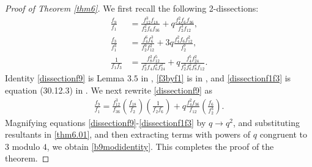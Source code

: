 \documentclass[reqno]{amsart}
\theoremstyle{definition}
\theoremstyle{remark}
\numberwithin{equation}{section}
\begin{document}
\begin{proof}[Proof of Theorem \ref{thm6}]
	We first recall the following 2-dissections:
	\begin{align}\label{dissectionf9}
	\frac{f_9}{f_1}&= \frac{f^{3}_{12}f_{18}}{f^{2}_{2}f_{6}f_{36}}+q\frac{f^{2}_4f_{6}f_{36}}{f^{3}_2f_{12}},\\\label{f3byf1}
	\frac{f_3}{f^{3}_1}&= \frac{f^{6}_{4}f^{3}_{6}}{f^{9}_{2}f^{2}_{12}}+3q\frac{f^{2}_4f_{6}f^{2}_{12}}{f^{7}_2},\\\label{dissectionf1f3}
	\frac{1}{f_1f_3}&= \frac{f^{2}_{8}f^{5}_{12}}{f^{2}_{2}f_{4}f^{4}_{6}f^{2}_{24}}+q\frac{f^{5}_{4}f^{2}_{24}}{f^{4}_{2}f^{2}_{6}f^{2}_8f_{12}}.
	\end{align}
	Identity \eqref{dissectionf9} is Lemma $3.5$ in \cite{xia_yao}, \eqref{f3byf1} is in \cite{naika_gireesh}, and \eqref{dissectionf1f3} is equation (30.12.3) in \cite{hirschhorn}. We next rewrite \eqref{dissectionf9} as 
	\begin{align}\label{thm6.01}
	\frac{f_9}{f_1}= \frac{f^{3}_{12}}{f_{36}}\left(\frac{f_{18}}{f_{2}} \right)\left(\frac{1}{f_{2}f_{6}} \right) +q\frac{f^{2}_4f_{36}}{f_{12}}\left(\frac{f_{6}}{f^{3}_{2}} \right).
	\end{align}
	Magnifying equations \eqref{dissectionf9}-\eqref{dissectionf1f3} by $q\rightarrow q^{2}$, and substituting resultants in \eqref{thm6.01}, and then extracting terms with powers of $q$ congruent to $3$ modulo $4$, we obtain \eqref{b9modidentity}. This completes the proof of the theorem.
\end{proof}	
\end{document}
